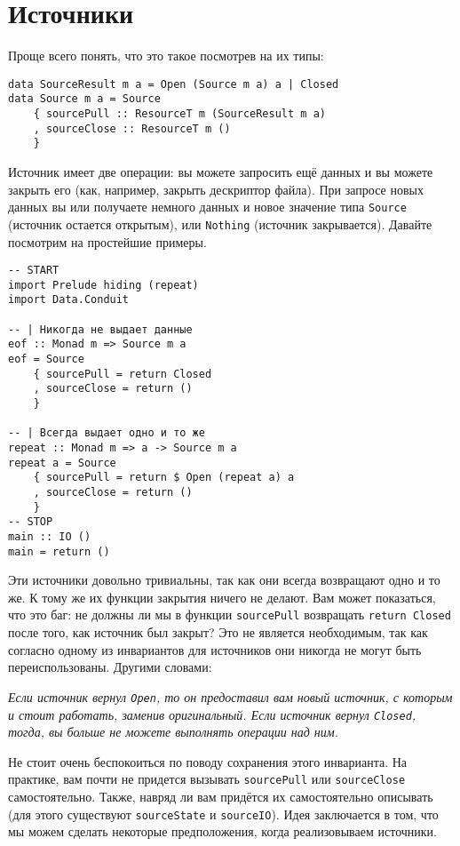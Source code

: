 \section{Источники}

Проще всего понять, что это такое посмотрев на их типы:
\begin{lstlisting}
data SourceResult m a = Open (Source m a) a | Closed
data Source m a = Source
    { sourcePull :: ResourceT m (SourceResult m a)
    , sourceClose :: ResourceT m ()
    }
\end{lstlisting}
Источник имеет две операции: вы можете запросить ещё данных и вы можете закрыть его (как,
например, закрыть дескриптор файла). При запросе новых данных вы или получаете немного
данных и новое  значение типа \lstinline=Source= (источник остается открытым), или
\lstinline=Nothing= (источник закрывается). Давайте посмотрим на простейшие примеры.
\begin{lstlisting}
-- START
import Prelude hiding (repeat)
import Data.Conduit

-- | Никогда не выдает данные
eof :: Monad m => Source m a
eof = Source
    { sourcePull = return Closed
    , sourceClose = return ()
    }

-- | Всегда выдает одно и то же
repeat :: Monad m => a -> Source m a
repeat a = Source
    { sourcePull = return $ Open (repeat a) a
    , sourceClose = return ()
    }
-- STOP
main :: IO ()
main = return ()
\end{lstlisting}
Эти источники довольно тривиальны, так как они всегда возвращают одно и то же. К тому
же их функции закрытия ничего не делают. Вам может показаться, что это баг: не должны ли 
мы в функции \lstinline=sourcePull= возвращать  \verb=return Closed= после того, как
источник был
закрыт? Это не является необходимым, так как согласно одному из инвариантов для
источников они никогда не могут быть переиспользованы. Другими словами:
    
\textit{Если источник вернул \lstinline=Open=, то он предоставил вам новый источник, с
которым и
стоит работать, заменив оригинальный. Если источник вернул \lstinline=Closed=, тогда, вы
больше не можете выполнять операции над ним.}
    
Не стоит очень беспокоиться по поводу сохранения этого инварианта. На практике, вам почти
не придется вызывать \lstinline=sourcePull= или \lstinline=sourceClose= самостоятельно.
Также, навряд ли вам придётся их самостоятельно описывать (для этого существуют
\lstinline=sourceState= и \lstinline=sourceIO=).
Идея заключается в том, что мы можем сделать некоторые предположения, когда реализовываем
источники.

